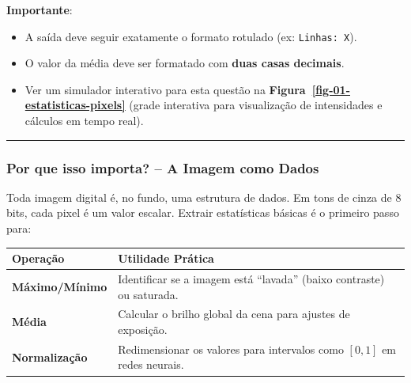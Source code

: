 \documentclass[
  portuguese,
  letterpaper,
  openany,
  oneside,
  12pt,
  a4paper]{book}
\providecommand{\tightlist}{%
  \setlength{\itemsep}{0pt}\setlength{\parskip}{0pt}}
\begin{document}
 \textbf{Importante}:

\begin{itemize}
\tightlist
\item
  A saída deve seguir exatamente o formato rotulado (ex:
  \texttt{Linhas:\ X}).
\item
  O valor da média deve ser formatado com \textbf{duas casas decimais}.
\item
  Ver um simulador interativo para esta questão na
  \textbf{Figura~\ref{fig-01-estatisticas-pixels}} (grade interativa
  para visualização de intensidades e cálculos em tempo real).
\end{itemize}

\begin{center}\rule{0.5\linewidth}{0.5pt}\end{center}

\subsubsection{\texorpdfstring{ Por que isso importa? -- A
Imagem como
Dados}{ Por que isso importa? -- A Imagem como Dados}}\label{por-que-isso-importa-a-imagem-como-dados}

Toda imagem digital é, no fundo, uma estrutura de dados. Em tons de
cinza de 8 bits, cada pixel é um valor escalar. Extrair estatísticas
básicas é o primeiro passo para:

\begin{longtable}[]{@{}
  >{\raggedright\arraybackslash}p{}
  >{\raggedright\arraybackslash}p{}@{}}
\toprule\noalign{}
\begin{minipage}[b]{\linewidth}\raggedright
Operação
\end{minipage} & \begin{minipage}[b]{\linewidth}\raggedright
Utilidade Prática
\end{minipage} \\
\midrule\noalign{}
\endhead
\bottomrule\noalign{}
\endlastfoot
\textbf{Máximo/Mínimo} & Identificar se a imagem está ``lavada'' (baixo
contraste) ou saturada. \\
\textbf{Média} & Calcular o brilho global da cena para ajustes de
exposição. \\
\textbf{Normalização} & Redimensionar os valores para intervalos como
\([0, 1]\) em redes neurais. \\
\end{longtable}
\end{document}
